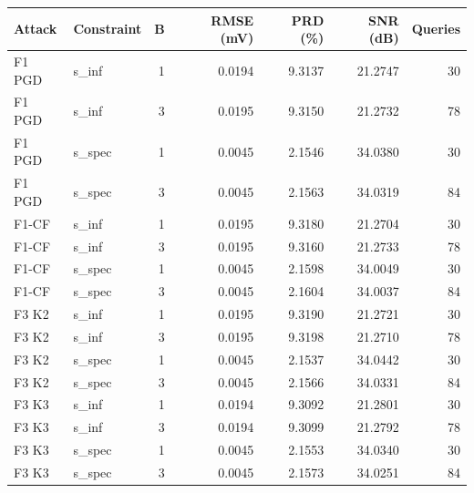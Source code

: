 \begin{tabular}{llrrrrr}
\toprule
Attack & Constraint & B & RMSE (mV) & PRD (\%) & SNR (dB) & Queries \\
\midrule
F1 PGD & s\_inf & 1 & 0.0194 & 9.3137 & 21.2747 & 30 \\
F1 PGD & s\_inf & 3 & 0.0195 & 9.3150 & 21.2732 & 78 \\
F1 PGD & s\_spec & 1 & 0.0045 & 2.1546 & 34.0380 & 30 \\
F1 PGD & s\_spec & 3 & 0.0045 & 2.1563 & 34.0319 & 84 \\
F1-CF & s\_inf & 1 & 0.0195 & 9.3180 & 21.2704 & 30 \\
F1-CF & s\_inf & 3 & 0.0195 & 9.3160 & 21.2733 & 78 \\
F1-CF & s\_spec & 1 & 0.0045 & 2.1598 & 34.0049 & 30 \\
F1-CF & s\_spec & 3 & 0.0045 & 2.1604 & 34.0037 & 84 \\
F3 K2 & s\_inf & 1 & 0.0195 & 9.3190 & 21.2721 & 30 \\
F3 K2 & s\_inf & 3 & 0.0195 & 9.3198 & 21.2710 & 78 \\
F3 K2 & s\_spec & 1 & 0.0045 & 2.1537 & 34.0442 & 30 \\
F3 K2 & s\_spec & 3 & 0.0045 & 2.1566 & 34.0331 & 84 \\
F3 K3 & s\_inf & 1 & 0.0194 & 9.3092 & 21.2801 & 30 \\
F3 K3 & s\_inf & 3 & 0.0194 & 9.3099 & 21.2792 & 78 \\
F3 K3 & s\_spec & 1 & 0.0045 & 2.1553 & 34.0340 & 30 \\
F3 K3 & s\_spec & 3 & 0.0045 & 2.1573 & 34.0251 & 84 \\
\bottomrule
\end{tabular}

